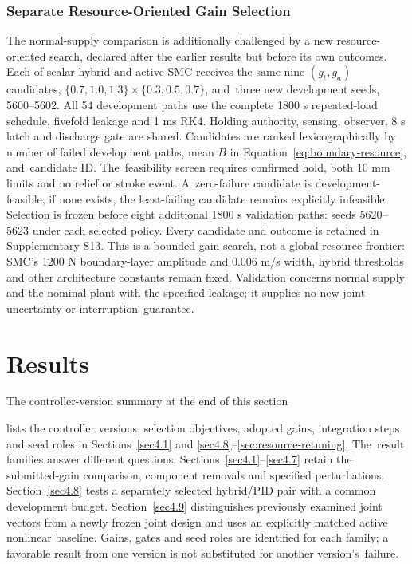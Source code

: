 \documentclass[machines,article,submit,pdftex,moreauthors]{Definitions/mdpi}
\begin{document}
\subsubsection{Separate Resource-Oriented Gain Selection}
The normal-supply comparison is additionally challenged by a new resource-oriented search, declared after the earlier results but before its own outcomes. Each of scalar hybrid and active SMC receives the same nine $(g_t,g_a)$ candidates, $\{0.7,1.0,1.3\}\times\{0.3,0.5,0.7\}$, and~three new development seeds, 5600--5602. All 54 development paths use the complete 1800 s repeated-load schedule, fivefold leakage and 1 ms RK4. Holding authority, sensing, observer, 8 s latch and discharge gate are shared. Candidates are ranked lexicographically by number of failed development paths, mean $B$ in Equation~\eqref{eq:boundary-resource}, and~candidate ID. The~feasibility screen requires confirmed hold, both 10 mm limits and no relief or stroke event. A~zero-failure candidate is development-feasible; if none exists, the least-failing candidate remains explicitly infeasible. Selection is frozen before eight additional 1800 s validation paths: seeds 5620--5623 under each selected policy. Every candidate and outcome is retained in Supplementary S13. This is a bounded gain search, not a global resource frontier: SMC's 1200 N boundary-layer amplitude and 0.006 m/s width, hybrid thresholds and other architecture constants remain fixed. Validation concerns normal supply and the nominal plant with the specified leakage; it supplies no new joint-uncertainty or interruption~guarantee.


\section{Results}
The controller-version summary at the end of this section

lists the controller versions, selection objectives, adopted gains, integration steps and seed roles in Sections~\ref{sec4.1} and \ref{sec4.8}--\ref{sec:resource-retuning}. The~result families answer different questions. Sections~\ref{sec4.1}--\ref{sec4.7} retain the submitted-gain comparison, component removals and specified perturbations. Section~\ref{sec4.8} tests a separately selected hybrid/PID pair with a common development budget. Section~\ref{sec4.9} distinguishes previously examined joint vectors from a newly frozen joint design and uses an explicitly matched active nonlinear baseline. Gains, gates and seed roles are identified for each family; a favorable result from one version is not substituted for another version's~failure.
\end{document}
